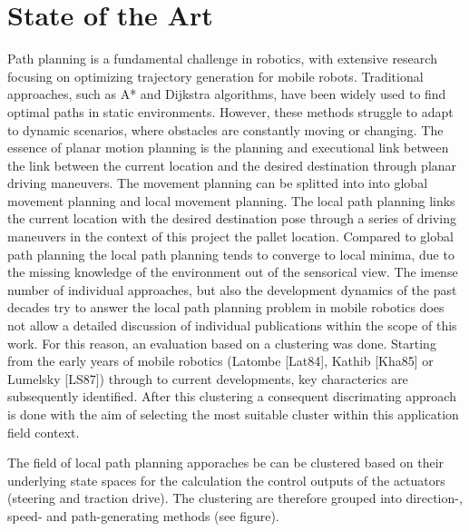 \documentclass{amam}                %
\begin{document}
\section{State of the Art}
Path planning is a fundamental challenge in robotics, with extensive research focusing on optimizing trajectory generation 
for mobile robots. Traditional approaches, such as A* and Dijkstra algorithms, have been widely used to find optimal paths 
in static environments. However, these methods struggle to adapt to dynamic scenarios, where obstacles are constantly moving 
or changing. The essence of planar motion planning is the planning and executional link between the link between the current 
location and the desired destination through planar driving maneuvers. The movement planning can be splitted into 
into global movement planning and local movement planning. The local path planning links the current location with the
desired destination pose through a series of driving maneuvers in the context of this project the pallet location. 
Compared to global path planning the local path planning tends to converge to local minima, due to the missing knowledge
of the environment out of the sensorical view.  The imense number of individual approaches, but also the development dynamics of the past decades try to answer the local path 
planning problem in mobile robotics does not allow a detailed discussion of individual publications within the scope of this work.
For this reason, an evaluation based on a clustering was done. Starting from the early years of mobile robotics 
(Latombe [Lat84], Kathib [Kha85] or Lumelsky [LS87]) through to current developments, key characterics are subsequently
identified. After this clustering a consequent discrimating approach is done with the aim of selecting the most suitable 
cluster within this application field context. 

The field of local path planning  apporaches be can be clustered based on their underlying state spaces for the calculation
the control outputs of the actuators (steering and traction drive). The clustering are therefore grouped into 
direction-, speed- and path-generating methods (see figure).
\end{document}
